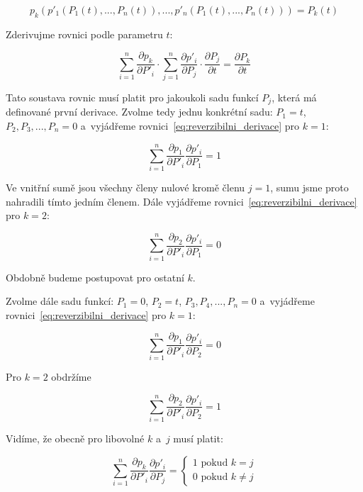 \begin{equation}
p_k(p'_1(P_1(t), ..., P_n(t)), ..., p'_n(P_1(t), ..., P_n(t))) = P_k(t)
\end{equation}

Zderivujme rovnici podle parametru \(t\):

\begin{equation}
\label{eq:reverzibilni_derivace}
\sum_{i=1}^n \frac{\partial p_k}{\partial P'_i} \cdot \sum_{j=1}^n \frac{\partial p'_i}{\partial P_j} \cdot \frac{\partial P_j}{\partial t} = \frac{\partial P_k}{\partial t}
\end{equation}

Tato soustava rovnic musí platit pro jakoukoli sadu funkcí \(P_j\), která má definované první derivace. Zvolme tedy jednu konkrétní sadu: \(P_1 = t\), \(P_2, P_3, ..., P_n = 0\) a~vyjádřeme rovnici~\eqref{eq:reverzibilni_derivace} pro \(k = 1\):

\begin{equation}
\sum_{i=1}^n \frac{\partial p_1}{\partial P'_i} \frac{\partial p'_i}{\partial P_1} = 1
\end{equation}

Ve vnitřní sumě jsou všechny členy nulové kromě členu \(j = 1\), sumu jsme proto nahradili tímto jedním členem.
Dále vyjádřeme rovnici~\eqref{eq:reverzibilni_derivace} pro \(k = 2\):

\begin{equation}
\sum_{i=1}^n \frac{\partial p_2}{\partial P'_i} \frac{\partial p'_i}{\partial P_1} = 0
\end{equation}

Obdobně budeme postupovat pro ostatní \(k\).

Zvolme dále sadu funkcí: \(P_1 = 0\), \(P_2 = t\), \(P_3, P_4, ..., P_n = 0\) a~vyjádřeme rovnici~\eqref{eq:reverzibilni_derivace} pro \(k = 1\):

\begin{equation}
\sum_{i=1}^n \frac{\partial p_1}{\partial P'_i} \frac{\partial p'_i}{\partial P_2} = 0
\end{equation}

Pro \(k = 2\) obdržíme

\begin{equation}
\sum_{i=1}^n \frac{\partial p_2}{\partial P'_i} \frac{\partial p'_i}{\partial P_2} = 1
\end{equation}

Vidíme, že obecně pro libovolné \(k\) a~\(j\) musí platit:

\begin{equation}
\sum_{i=1}^n \frac{\partial p_k}{\partial P'_i} \frac{\partial p'_i}{\partial P_j} =
\begin{cases}
	1 \text{ pokud } k = j \\
	0 \text{ pokud } k \neq j
\end{cases}
\end{equation}

